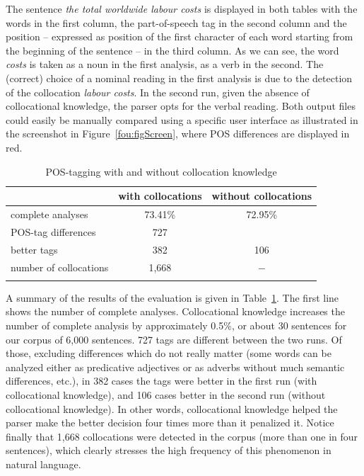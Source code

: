 \documentclass[output=paper]{langsci/langscibook}
\begin{document}
 
 

The sentence  \textit{the total worldwide labour costs} is displayed in both tables with the words in the first column, the part-of-speech tag in the second column and the position – expressed as position of the first character of each word starting from the beginning of the sentence – in the third column. As we can see, the word \textit{costs} is taken as a noun in the first analysis, as a verb in the second. The (correct) choice of a nominal reading in the first analysis is due to the detection of the collocation \textit{labour costs}. In the second run, given the absence of collocational knowledge, the parser opts for the verbal reading. Both output files could easily be manually compared using a specific user interface as illustrated in the screenshot in Figure~\ref{fou:figScreen}, where POS differences are displayed in red.

\begin{table}[h]
  \begin{tabular}{lcc}
    \lsptoprule
    & with collocations & without collocations \\ %
    \midrule
    complete analyses & 73.41\% & 72.95\% \\
    POS-tag differences & 727 \\
    better tags & 382 & 106\\
    number of collocations & 1,668 & $-$ \tabularnewline
    \lspbottomrule
  \end{tabular}
  \caption{\label{fou:fig9}POS-tagging with and without collocation knowledge}
\end{table}  

A summary of the results of the evaluation is given in Table~\ref{fou:fig9}. The first line shows the number of complete analyses. Collocational knowledge increases the number of complete analysis by approximately 0.5\%, or about 30 sentences for our corpus of 6,000 sentences. 727 tags are different between the two runs. Of those, excluding differences which do not really matter (some words can be analyzed either as predicative adjectives or as adverbs without much semantic differences, etc.), in 382 cases the tags were better in the first run (with collocational knowledge), and 106 cases better in the second run (without collocational knowledge). In other words, collocational knowledge helped the parser make the better decision four times more than it penalized it. Notice finally that 1,668 collocations were detected in the corpus (more than one in four sentences), which clearly stresses the high frequency of this phenomenon in natural language.
\end{document}

